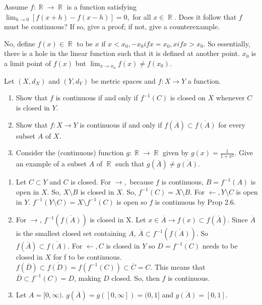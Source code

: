 \documentclass[12pt,letterpaper,boxed]{hmcpset}
\DeclareMathOperator{\R}{\mathbb{R}}
\begin{document}
\begin{problem}[Exercise 2.9]
Assume $f: \R \rightarrow \R$ is a function satisfying $\lim_{h\rightarrow 0} [f(x + h) - f(x - h)] = 0,$ for all $x \in \R$. Does it follow that $f$ must be continuous? If so, give a proof; if not, give a counterexample.
\end{problem}

\begin{solution}
No, define $f(x) \in \R$ to be $x$ if $x < x_0, -x_0 if x = x_0, x if x > x_0$. So essentially, there is a hole in the linear function such that it is defined at another point. $x_0$ is a limit point of $f(x)$ but $\lim_{x \rightarrow x_0} f(x) \neq f(x_0).$
\end{solution}

\begin{problem}[Exercise 2.10]
Let $(X, d_X)$ and $(Y, d_Y)$ be metric spaces and $f: X \rightarrow Y$ a function. 
\vspace{-2mm}
    \begin{enumerate}
        \itemsep0em
        \item Show that $f$ is continuous if and only if $f^{-1}(C)$ is closed on $X$ whenever $C$ is closed in $Y$.
        \item Show that $f: X \rightarrow Y$ is continuous if and only if $f(\overline{A})\subset\overline{f(A)}$ for every subset $A$ of $X$.
        \item Consider the (continuous) function $g: \R \rightarrow \R$ given by $g(x) = \frac{1}{1 + x^{2}}.$ Give an example of a subset $A$ of $\R$ such that $g(\overline{A})\neq\overline{g(A)}.$
    \end{enumerate}
\end{problem}

\begin{solution}
\begin{enumerate}
        \itemsep0em
        \item Let $C\subset Y$ and $C$ is closed. For $\rightarrow,$ because $f$ is continuous, $B=f^{-1}(A)$ is open in $X.$ So, $X\setminus B$ is closed in $X$. So, $f^{-1}(C) = X\setminus B$. For $\leftarrow, Y\setminus C$ is open in $Y$. $f^{-1}(Y\setminus C) = X\setminus f^{-1}(C)$ is open so $f$ is continuous by Prop 2.6.  
        \item For $\rightarrow$, $f^{-1}(\overline{f(A)})$ is closed in X. Let $x \in \overline{A}\rightarrow f(x)\subset f(\overline{A})$. Since $\overline{A}$ is the smallest closed set containing $A$, $\overline{A}\subset f^{-1}(\overline{f(A)})$. So $f(\overline{A})\subset\overline{f(A)}$. For $\leftarrow, C$ is closed in $Y$ so $D = f^{-1}(C)$ needs to be closed in $X$ for f to be continuous. $f(\overline{D})\subset \overline{f(D)}=f(f^{-1}(C))\subset \overline{C}=C$. This means that $\overline{D}\subset f^{-1}(C)=D$, making $D$ closed. So, then $f$ is continuous. 
        \item Let $A=[0,\infty)$. $g(\overline{A})=g([0,\infty]) = (0,1]$ and $\overline{g(A)}=[0,1].$
    \end{enumerate}
\end{solution}
\end{document}
